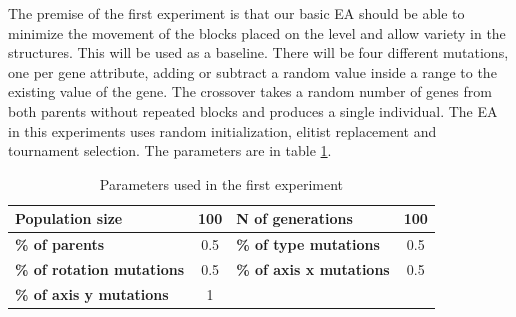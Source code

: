 \documentclass[sigconf]{acmart}
\newcommand{\myfloatalign}{\centering} %
\begin{document}
The premise of the first experiment is that our basic EA should be able to 
minimize the movement of the blocks placed on the level and
allow variety in the structures. This will
be used as a baseline.
There will be four different mutations, one per gene attribute, adding or subtract a random value inside a range to the existing value of the gene.
The crossover takes a random number of genes from both parents
without repeated blocks and produces a single individual.
The EA in this experiments uses random initialization, elitist replacement and tournament selection. The parameters are in table \ref{t:base}.


\begin{table}
	\myfloatalign
	\caption{Parameters used in the first experiment} 
	\label{t:base}
	\begin{tabular}{lclc}
		\hline
		\textbf{Population size} & 100 & \textbf{N of generations} & 100\\ \hline
		\textbf{\% of parents} &  0.5 &\textbf{\% of type mutations} & 0.5\\  \hline
		\textbf{\% of rotation mutations} & 0.5 & \textbf{\% of axis x mutations}  & 0.5 \\  \hline
		\textbf{\% of axis y mutations}  & 1 & &\\  \hline
	\end{tabular}
\end{table}

\end{document}
